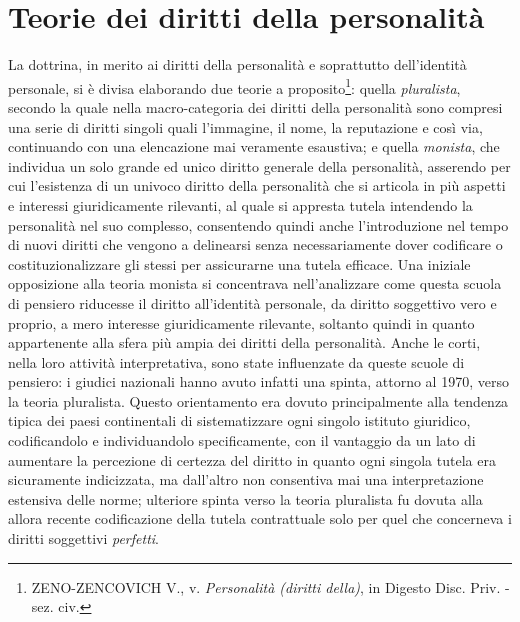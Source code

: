 \section{Teorie dei diritti della personalità}
La dottrina, in merito ai diritti della personalità e soprattutto dell'identità personale, si è divisa elaborando due teorie a proposito\footnote{ZENO-ZENCOVICH V., v. \textit{Personalità (diritti della)}, in Digesto Disc. Priv. - sez. civ.}: quella \textit{pluralista}, secondo la quale nella macro-categoria dei diritti della personalità sono compresi una serie di diritti singoli quali l’immagine, il nome, la reputazione e così via, continuando con una elencazione mai veramente esaustiva; e quella \textit{monista}, che individua un solo grande ed unico diritto generale della personalità, asserendo per cui l'esistenza di un univoco diritto della personalità che si articola in più aspetti e interessi giuridicamente rilevanti, al quale si appresta tutela intendendo la personalità nel suo complesso, consentendo quindi anche l'introduzione nel tempo di nuovi diritti che vengono a delinearsi senza necessariamente dover codificare o costituzionalizzare gli stessi per assicurarne una tutela efficace.
Una iniziale opposizione alla teoria monista si concentrava nell'analizzare come questa scuola di pensiero riducesse il diritto all’identità personale, da diritto soggettivo vero e proprio, a mero interesse giuridicamente rilevante, soltanto quindi in quanto appartenente alla sfera più ampia dei diritti della personalità.
Anche le corti, nella loro attività interpretativa, sono state influenzate da queste scuole di pensiero:
i giudici nazionali hanno avuto infatti una spinta, attorno al 1970, verso la teoria pluralista. Questo orientamento era dovuto principalmente alla tendenza tipica dei paesi continentali di sistematizzare ogni singolo istituto giuridico, codificandolo e individuandolo specificamente, con il vantaggio da un lato di aumentare la percezione di certezza del diritto in quanto ogni singola tutela era sicuramente indicizzata, ma dall'altro non consentiva mai una interpretazione estensiva delle norme; ulteriore spinta verso la teoria pluralista fu dovuta alla allora recente codificazione della tutela contrattuale solo per quel che concerneva i diritti soggettivi \textit{perfetti}.